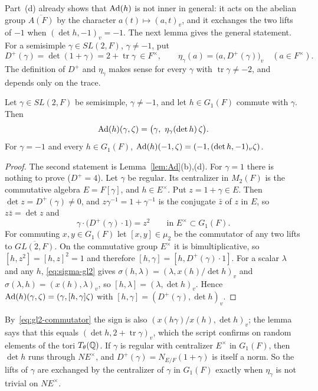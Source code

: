 Part~(d) already shows that $\operatorname{Ad}(h)$ is not inner in general: it
acts on the abelian group $\overline{A(F)}$ by the character
$a(t)\mapsto(a,t)_v$, and it exchanges the two lifts of $-1$ when
$(\det h,-1)_v=-1$. The next lemma gives the general statement. For a
semisimple $\gamma\in SL(2,F)$, $\gamma\ne-1$, put
\begin{equation}\label{eq:eta}
D^+(\gamma)=\det(1+\gamma)=2+\operatorname{tr}\gamma\ \in F^\times,\qquad
\eta_\gamma(a)=\bigl(a,D^+(\gamma)\bigr)_v\quad(a\in F^\times).
\end{equation}
The definition of $D^+$ and $\eta_\gamma$ makes sense for every $\gamma$
with $\operatorname{tr}\gamma\ne-2$, and depends only on the trace.

\begin{lemma}\label{lem:eta}
Let $\gamma\in SL(2,F)$ be semisimple, $\gamma\ne-1$, and let $h\in
G_1(F)$ commute with $\gamma$. Then
\[
\Ad(h)(\gamma,\zeta)=\bigl(\gamma,\ \eta_\gamma(\det h)\,\zeta
\bigr).
\]
For $\gamma=-1$ and every $h\in G_1(F)$,
$\operatorname{Ad}(h)(-1,\zeta)=(-1,(\det h,-1)_v\zeta)$.
\end{lemma}

\begin{proof}
The second statement is Lemma~\ref{lem:Ad}(b),(d). For $\gamma=1$ there is
nothing to prove ($D^+=4$). Let $\gamma$ be regular. Its centralizer in
$M_2(F)$ is the commutative algebra $E=F[\gamma]$, and $h\in E^\times$.
Put $z=1+\gamma\in E$. Then $\det z=D^+(\gamma)\ne0$, and $z\gamma^{-1}=
1+\gamma^{-1}$ is the conjugate $\bar z$ of $z$ in $E$, so
$z\bar z=\det z$ and
\[
\gamma\cdot\bigl(D^+(\gamma)\cdot1\bigr)=z^2\qquad\text{in }E^\times
\subset G_1(F).
\]
For commuting $x,y\in G_1(F)$ let $[x,y]\in\mu_2$ be the commutator of
any two lifts to $\overline{GL(2,F)}$. On the commutative group
$E^\times$ it is bimultiplicative, so $[h,z^2]=[h,z]^2=1$ and therefore
$[h,\gamma]=[h,D^+(\gamma)\cdot1]$. For a scalar $\lambda$ and any $h$,
\eqref{eq:sigma-gl2} gives $\sigma(h,\lambda)=(\lambda,x(h)/\det h)_v$ and
$\sigma(\lambda,h)=(x(h),\lambda)_v$, so $[h,\lambda]=(\lambda,\det h)_v$.
Hence $\operatorname{Ad}(h)(\gamma,\zeta)=(\gamma,[h,\gamma]\zeta)$ with
$[h,\gamma]=(D^+(\gamma),\det h)_v$.
\end{proof}

By~\eqref{eq:gl2-commutator} the sign is also $(x(h\gamma)/x(h),\det
h)_v$; the lemma says that this equals $(\det h,2+\operatorname{tr}
\gamma)_v$, which the script confirms on random elements of the tori
$T_\theta(\mathbb{Q})$. If $\gamma$ is regular with centralizer $E^\times$ in
$G_1(F)$, then $\det h$ runs through $N E^\times$, and $D^+(\gamma)=
N_{E/F}(1+\gamma)$ is itself a norm. So the lifts of $\gamma$ are
exchanged by the centralizer of $\gamma$ in $G_1(F)$ exactly when
$\eta_\gamma$ is not trivial on $N E^\times$.

